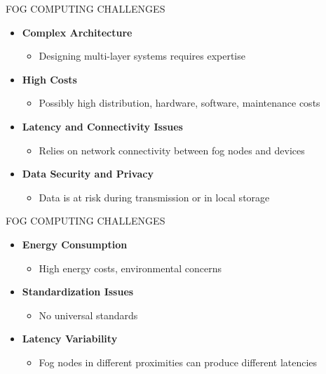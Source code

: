 \documentclass[aspectratio=169,xcolor=dvipsnames]{beamer}
\begin{document}
\begin{frame}{FOG COMPUTING CHALLENGES}
    \begin{itemize}
        \item \textbf{Complex Architecture}
        \begin{itemize}
            \item Designing multi-layer systems requires expertise
        \end{itemize}
         \item \textbf{High Costs}
         \begin{itemize}
            \item Possibly high distribution, hardware, software, maintenance costs
        \end{itemize}
        \item \textbf{Latency and Connectivity Issues}
        \begin{itemize}
            \item Relies on network connectivity between fog nodes and devices
        \end{itemize}
         \item \textbf{Data Security and Privacy}
         \begin{itemize}
            \item Data is at risk during transmission or in local storage
        \end{itemize}
    \end{itemize}
\end{frame}

\begin{frame}{FOG COMPUTING CHALLENGES}
    \begin{itemize}
        \item \textbf{Energy Consumption}
        \begin{itemize}
            \item High energy costs, environmental concerns
        \end{itemize}
         \item \textbf{Standardization Issues}
         \begin{itemize}
            \item No universal standards
        \end{itemize}
        \item \textbf{Latency Variability}
        \begin{itemize}
            \item Fog nodes in different proximities can produce different latencies
        \end{itemize}
    \end{itemize}
\end{frame}
\end{document}
